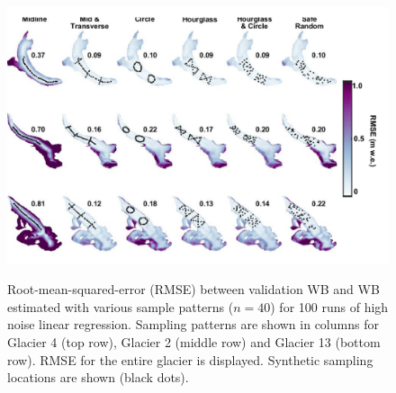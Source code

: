 \documentclass[twocolumn,letterpaper]{igs}
\begin{document}
\begin{figure}
	\centering
	\includegraphics[width =\textwidth]{SynObsRMSEmap.pdf}\\
	\caption{Root-mean-squared-error (RMSE) between validation WB and WB estimated with various sample patterns ($n=40$) for 100 runs of high noise linear regression. Sampling patterns are shown in columns for Glacier 4 (top row), Glacier 2 (middle row) and Glacier 13 (bottom row). RMSE for the entire glacier is displayed. Synthetic sampling locations are shown (black dots).}
	\label{fig:SynObsRMSEmap}
\end{figure}
\end{document}
